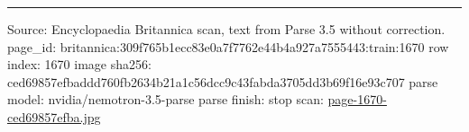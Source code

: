 \documentclass[10pt]{article}
\begin{document}
\vfill\par\noindent\rule{\linewidth}{0.4pt}\par
{\scriptsize\color{gray}\noindent Source: Encyclopaedia Britannica scan, text from Parse 3.5 without correction. page\_id: britannica:309f765b1ecc83e0a7f7762e44b4a927a7555443:train:1670 \quad row index: 1670 \quad image sha256: ced69857efbaddd760fb2634b21a1c56dcc9c43fabda3705dd3b69f16e93c707 \quad parse model: nvidia/nemotron-3.5-parse \quad parse finish: stop \quad scan: \href{../scans/page-1670-ced69857efba.jpg}{page-1670-ced69857efba.jpg}\par}
\end{document}

